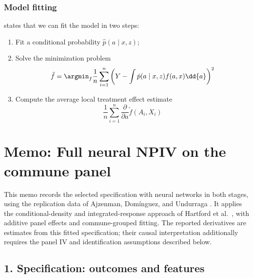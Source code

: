 \documentclass{article}
\begin{document}
\subsubsection{Model fitting}
 states that we can fit the model in two steps:
\begin{enumerate}
    \item Fit a conditional probability \(\hat{p}(a\mid x, z)\);
    \item Solve the minimization problem
    \begin{equation*}
        \tilde{f} = \argmin_f \frac{1}{n}\sum_{i=1}^n\left(Y - \int \hat{p}(a\mid x, z)f(a, x)\dd{a}\right)^2
    \end{equation*}
    \item Compute the average local treatment effect estimate
    \begin{equation*}
        \frac{1}{n}\sum_{i = 1}^n\frac{\partial}{\partial a}\tilde f(A_i, X_i)
    \end{equation*}
\end{enumerate}


\medskip
\section*{Memo: Full neural NPIV on the commune panel}
This memo records the selected specification with neural networks in both stages, using the replication data of Ajzenman, Dom\'{i}nguez, and Undurraga \cite{immigration}. It applies the conditional-density and integrated-response approach of Hartford et al.\ \cite{deepiv}, with additive panel effects and commune-grouped fitting. The reported derivatives are estimates from this fitted specification; their causal interpretation additionally requires the panel IV and identification assumptions described below.

\subsection*{1. Specification: outcomes and features}
\end{document}
